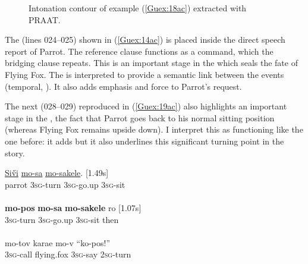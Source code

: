 \documentclass[output=paper]{LSP/langsci}
\begin{document}
\begin{figure}[ht]
\caption{Intonation contour of example (\ref{Guex:18ac}) extracted with PRAAT. \label{GuF7}}
\end{figure}

The  (lines 024--025) shown in (\ref{Guex:14ac}) is placed inside the direct speech report of Parrot. The reference clause functions as a command, which the bridging clause repeats. This is an important stage in the  which seals the fate of Flying Fox. The  is interpreted to provide a semantic link between the events (temporal, ). It also adds emphasis and force to Parrot’s request. 

The next  (028--029) reproduced in (\ref{Guex:19ac}) also highlights an important stage in the , the fact that Parrot goes back to his normal sitting position (whereas Flying Fox remains upside down). I interpret this  as functioning like the one before: it adds  but it also underlines this significant turning point in the story.

\begin{exe}
\ex \label{Guex:19ac}
\begin{xlist}
\ex \label{Guex:19a}
\gll \underline{Si\H{v}i}   \underline{}        \underline{mo-sa}        \underline{mo-sakele}.           [1.49s]\\
parrot   \textsc{3sg}-turn    \textsc{3sg}-go.up   \textsc{3sg}-sit \\
\glt {}\\
\ex \label{Guex:19b}
\gll \textbf{mo-pos}        \textbf{mo-sa}        \textbf{mo-sakele}          ro [1.07s]\\
\textsc{3sg}-turn    \textsc{3sg}-go.up   \textsc{3sg}-sit   then\\
\glt {}\\
\ex \label{Guex:19c}
\gll   mo-tov   karae     mo-v         ``ko-pos!''\\     	       
 \textsc{3sg}-call   flying.fox   \textsc{3sg}-say   \textsc{2sg}-turn\\
\glt {} 
\end{xlist}
\end{exe}
\end{document}
